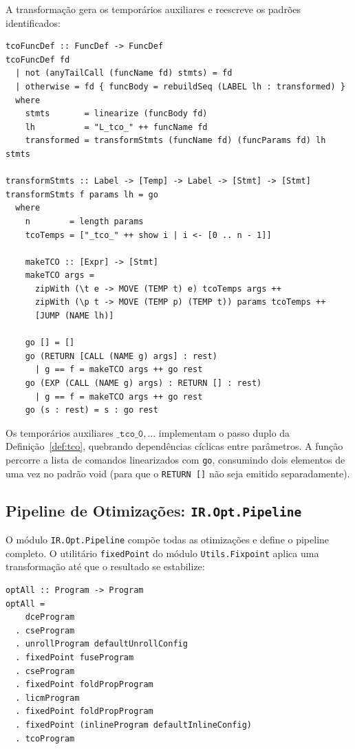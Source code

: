 A transformação gera os temporários auxiliares e reescreve os padrões
identificados:

\begin{verbatim}
tcoFuncDef :: FuncDef -> FuncDef
tcoFuncDef fd
  | not (anyTailCall (funcName fd) stmts) = fd
  | otherwise = fd { funcBody = rebuildSeq (LABEL lh : transformed) }
  where
    stmts       = linearize (funcBody fd)
    lh          = "L_tco_" ++ funcName fd
    transformed = transformStmts (funcName fd) (funcParams fd) lh stmts

transformStmts :: Label -> [Temp] -> Label -> [Stmt] -> [Stmt]
transformStmts f params lh = go
  where
    n        = length params
    tcoTemps = ["_tco_" ++ show i | i <- [0 .. n - 1]]

    makeTCO :: [Expr] -> [Stmt]
    makeTCO args =
      zipWith (\t e -> MOVE (TEMP t) e) tcoTemps args ++
      zipWith (\p t -> MOVE (TEMP p) (TEMP t)) params tcoTemps ++
      [JUMP (NAME lh)]

    go [] = []
    go (RETURN [CALL (NAME g) args] : rest)
      | g == f = makeTCO args ++ go rest
    go (EXP (CALL (NAME g) args) : RETURN [] : rest)
      | g == f = makeTCO args ++ go rest
    go (s : rest) = s : go rest
\end{verbatim}

Os temporários auxiliares $\mathtt{\_tco\_0}, \ldots$ implementam o passo duplo
da Definição~\ref{def:tco}, quebrando dependências cíclicas entre parâmetros.
A função percorre a lista de comandos linearizados com \texttt{go}, consumindo
dois elementos de uma vez no padrão void (para que o \texttt{RETURN []} não seja
emitido separadamente).

\subsection{Pipeline de Otimizações:
\texttt{IR.Opt.Pipeline}}\label{sec:impl-pipeline}

O módulo \texttt{IR.Opt.Pipeline} compõe todas as otimizações e define o
pipeline completo.  O utilitário \texttt{fixedPoint} do módulo
\texttt{Utils.Fixpoint} aplica uma transformação até que o resultado se
estabilize:

\begin{verbatim}
optAll :: Program -> Program
optAll =
    dceProgram
  . cseProgram
  . unrollProgram defaultUnrollConfig
  . fixedPoint fuseProgram
  . cseProgram
  . fixedPoint foldPropProgram
  . licmProgram
  . fixedPoint foldPropProgram
  . fixedPoint (inlineProgram defaultInlineConfig)
  . tcoProgram
\end{verbatim}

